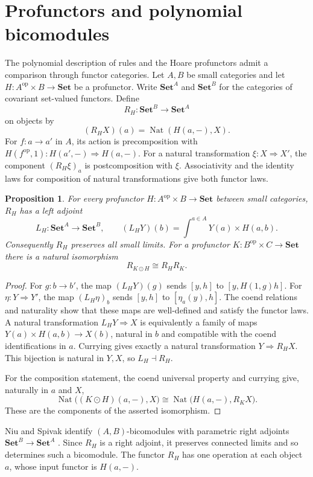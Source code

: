 \documentclass[11pt]{article}
\newtheorem{proposition}[theorem]{Proposition}
\theoremstyle{definition}
\theoremstyle{remark}
\newcommand{\Set}{\mathbf{Set}}
\newcommand{\op}{\mathrm{op}}
\begin{document}
\section{Profunctors and polynomial bicomodules}\label{poly:hoare}

The polynomial description of rules and the Hoare profunctors admit a
comparison through functor categories. Let $A,B$ be small categories and
let $H:A^{\op}\times B\to\Set$ be a profunctor. Write $\Set^A$ and
$\Set^B$ for the categories of covariant set-valued functors. Define
\[
 R_H:\Set^B\longrightarrow\Set^A
\]
on objects by
\[
 (R_HX)(a)=\operatorname{Nat}(H(a,-),X).
\]
For $f:a\to a'$ in $A$, its action is precomposition with
$H(f^{\op},1):H(a',-)\Rightarrow H(a,-)$. For a natural transformation
$\xi:X\Rightarrow X'$, the component $(R_H\xi)_a$ is
postcomposition with $\xi$. Associativity and the identity laws for
composition of natural transformations give both functor laws.

\begin{proposition}\label{poly:profunctor-adjunction}
For every profunctor $H:A^{\op}\times B\to\Set$ between small
categories, $R_H$ has a left adjoint
\[
 L_H:\Set^A\longrightarrow\Set^B,\qquad
 (L_HY)(b)=\int^{a\in A}Y(a)\times H(a,b).
\]
Consequently $R_H$ preserves all small limits. For a profunctor
$K:B^{\op}\times C\to\Set$ there is a natural isomorphism
\[
 R_{K\odot H}\cong R_H R_K.
\]
\end{proposition}
\begin{proof}
For $g:b\to b'$, the map $(L_HY)(g)$ sends $[y,h]$ to
$[y,H(1,g)h]$. For $\eta:Y\Rightarrow Y'$, the map
$(L_H\eta)_b$ sends $[y,h]$ to $[\eta_a(y),h]$. The coend
relations and naturality show that these maps are well-defined and
satisfy the functor laws. A natural transformation $L_HY\Rightarrow X$
is equivalently a family of maps
$Y(a)\times H(a,b)\to X(b)$, natural in $b$ and compatible with the
coend identifications in $a$. Currying gives exactly a natural
transformation $Y\Rightarrow R_HX$. This bijection is natural in
$Y,X$, so $L_H\dashv R_H$.

For the composition statement, the coend universal property and currying
give, naturally in $a$ and $X$,
\[
 \operatorname{Nat}\bigl((K\odot H)(a,-),X\bigr)
 \cong
 \operatorname{Nat}\bigl(H(a,-),R_KX\bigr).
\]
These are the components of the asserted isomorphism.
\end{proof}

Niu and Spivak identify $(A,B)$-bicomodules with parametric right adjoints
$\Set^B\to\Set^A$ \cite[Proposition~8.104, p.~336]{NS2024}.
Since $R_H$ is a right adjoint, it preserves connected limits and so
determines such a bicomodule. The functor $R_H$ has one operation at each
object $a$, whose input functor is $H(a,-)$.
\end{document}
